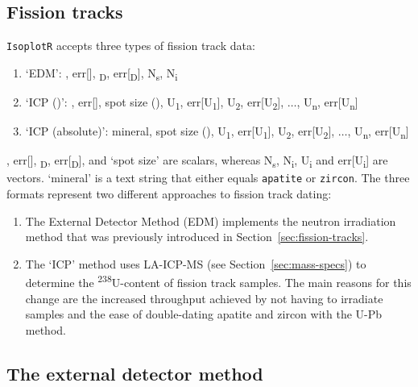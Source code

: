 \begin{refsection}

\chapter{Fission tracks}\label{ch:fissiontracks}

\texttt{IsoplotR} accepts three types of fission track data:

\begin{enumerate}
\item{`EDM':} \textzeta, err[\textzeta],
  \textrho\textsubscript{D}, err[\textrho\textsubscript{D}], 
  N\textsubscript{s}, N\textsubscript{i}
\item{`ICP (\textzeta)':} \textzeta, err[\textzeta], spot size
  (), U\textsubscript{1}, err[U\textsubscript{1}],
  U\textsubscript{2}, err[U\textsubscript{2}], $\ldots$,
  U\textsubscript{n}, err[U\textsubscript{n}]
\item{`ICP (absolute)':} mineral, spot size (),
  U\textsubscript{1}, err[U\textsubscript{1}], U\textsubscript{2},
  err[U\textsubscript{2}], $\ldots$, U\textsubscript{n},
  err[U\textsubscript{n}]
\end{enumerate}

\noindent \textzeta, err[\textzeta], \textrho\textsubscript{D},
err[\textrho\textsubscript{D}], and `spot size' are scalars, whereas
N\textsubscript{s}, N\textsubscript{i}, U\textsubscript{i} and
err[U\textsubscript{i}] are vectors. `mineral' is a text string that
either equals \texttt{apatite} or \texttt{zircon}.  The three formats
represent two different approaches to fission track dating:

\begin{enumerate}
\item The External Detector Method (EDM) implements the neutron
  irradiation method that was previously introduced in
  Section~\ref{sec:fission-tracks}.
\item The `ICP' method uses LA-ICP-MS (see
  Section~\ref{sec:mass-specs}) to determine the
  \textsuperscript{238}U-content of fission track samples.  The main
  reasons for this change are the increased throughput achieved by not
  having to irradiate samples and the ease of double-dating apatite
  and zircon with the U-Pb method.
\end{enumerate}

\section{The external detector method}
\label{sec:EDM}


\end{refsection}
